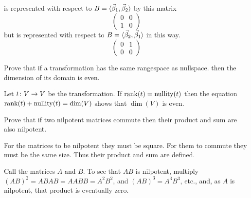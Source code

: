 \begin{exercises}
\begin{answer}
      is represented with respect to 
      $B=\langle\vec{\beta}_1,\vec{\beta}_2\rangle$ by this matrix
      \begin{equation*}
        \begin{pmatrix}
          0  &0  \\
          1  &0          
        \end{pmatrix}
      \end{equation*}
      but is represented with respect to 
      $B=\langle\vec{\beta}_2,\vec{\beta}_1\rangle$ in this way.
      \begin{equation*}
        \begin{pmatrix}
          0  &1  \\
          0  &0          
        \end{pmatrix}
      \end{equation*}
    \end{answer}
  \recommended \item
    Prove that if a transformation has the same rangespace as nullspace.
    then the dimension of its domain is even.
    \begin{answer}
      Let $\mbox{$t\colon V\to V$}$ be the transformation.
      If \( \operatorname{rank} (t)=\operatorname{nullity} (t) \) then the equation
      \( \operatorname{rank}(t)+\operatorname{nullity}(t)=\dim (V) \) shows that 
      \( \dim (V) \) is even.  
    \end{answer}
  \item 
    Prove that if two nilpotent matrices commute then their product and
    sum are also nilpotent.
    \begin{answer}
      For the matrices to be nilpotent they must be square.
      For them to commute they must be the same size.
      Thus their product and sum are defined.

      Call the matrices \( A \) and \( B \).
      To see that \( AB \) is nilpotent, multiply
      $
         (AB)^2=ABAB=AABB=A^2B^2$,
      and
         $(AB)^3=A^3B^3$, etc.,
      and, as \( A \) is nilpotent, that product is eventually zero.


\end{answer}
\end{exercises}
